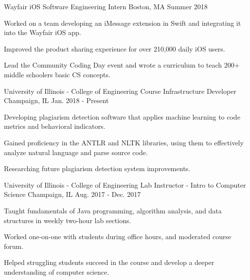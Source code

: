 
\begin{cventries}
\cventry
{Wayfair} %
{iOS Software Engineering Intern} %
{Boston, MA} %
{Summer 2018} %
{
	\begin{cvitems} %
		\item {Worked on a team developing an iMessage extension in Swift and integrating it into the Wayfair iOS app.}
		\item {Improved the product sharing experience for over 210,000 daily iOS users.}
		\item {Lead the Community Coding Day event and wrote a curriculum to teach 200+ middle schoolers basic CS concepts.}
	\end{cvitems}
}
\cventry
{University of Illinois - College of Engineering} %
{Course Infrastructure Developer} %
{Champaign, IL} %
{Jan. 2018 - Present} %
{
    \begin{cvitems} %
        \item {Developing plagiarism detection software that applies machine learning to code metrics and behavioral indicators.}
        \item {Gained proficiency in the ANTLR and NLTK libraries, using them to effectively analyze natural language and parse source code.}
       \item {Researching future plagiarism detection system improvements.}
    \end{cvitems}
}
\cventry
{University of Illinois - College of Engineering} %
{Lab Instructor - Intro to Computer Science} %
{Champaign, IL} %
{Aug. 2017 - Dec. 2017} %
{
	\begin{cvitems} %
		\item {Taught fundamentals of Java programming, algorithm analysis, and data structures in weekly two-hour lab sections.}
		\item {Worked one-on-one with students during office hours, and moderated course forum.}
		\item {Helped struggling students succeed in the course and develop a deeper understanding of computer science.}
	\end{cvitems}
}
\end{cventries}
